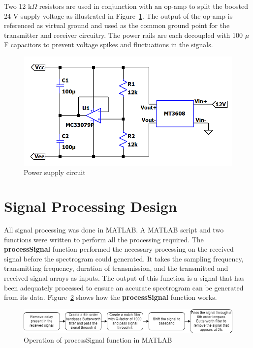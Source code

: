 \documentclass[class=report,11pt,crop=false]{standalone}
\begin{document}
Two 12 k$\Omega$ resistors are used in conjunction with an op-amp to split the boosted 24 V supply voltage as illustrated in Figure~\ref{fig:power-supply}. The output of the op-amp is referenced as virtual ground and used as the common ground point for the transmitter and receiver circuitry. The power rails are each decoupled with 100 $\mu$F capacitors to prevent voltage spikes and fluctuations in the signals.

\begin{figure}[htbp]
    \centering
    \includegraphics[width=0.45\columnwidth]{../Images/power_supply.png}
    \caption{Power supply circuit}
    \label{fig:power-supply}
\end{figure}


\section{Signal Processing Design}
All signal processing was done in \textsc{MATLAB}. A \textsc{MATLAB} script and two functions were written to perform all the processing required. The \textbf{processSignal} function performed the necessary processing on the received signal before the spectrogram could generated. It takes the sampling frequency, transmitting frequency, duration of transmission, and the transmitted and received signal arrays as inputs. The output of this function is a signal that has been adequately processed to ensure an accurate spectrogram can be generated from its data. Figure~\ref{fig:process-signal} shows how the \textbf{processSignal} function works.

\begin{figure}[htbp]
    \centering
    \includegraphics[width=1\columnwidth]{../Images/signal_processing.drawio.png}
    \caption{Operation of processSignal function in \textsc{MATLAB}}
    \label{fig:process-signal}
\end{figure}
\end{document}
